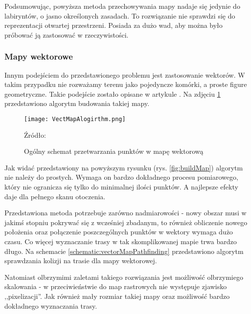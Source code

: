             Podsumowując, powyższa metoda przechowywania mapy nadaje się jedynie do labiryntów, o jasno określonych zasadach.
            To rozwiązanie nie sprawdzi się do reprezentacji otwartej przestrzeni.
            Posiada za dużo wad, aby można było próbować ją zastosować w rzeczywistości.

        \subsubsection{Mapy wektorowe}
            Innym podejściem do przedstawionego problemu jest zastosowanie wektorów.
            W takim przypadku nie rozważamy terenu jako pojedyncze komórki, a proste figure geometryczne.
            Takie podejście zostało opisane w artykule \cite{vector_map}.
            Na zdjęciu \ref{fig:buildVectMap} przedstawiono algorytm budowania takiej mapy.

            \begin{figure}[!ht]
                \centering
                \texttt{[image: VectMapAlogirthm.png]}
                \caption{Ogólny schemat przetwarzania punktów w mapę wektorową}
                Źródło: \cite{vector_map}
                \label{fig:buildVectMap}
            \end{figure}

            Jak widać przedstawiony na powyższym rysunku (rys. \ref{fig:buildMap}) algorytm nie należy do prostych.
            Wymaga on bardzo dokładnego procesu pomiarowego, który nie ogranicza się tylko do minimalnej ilości punktów.
            A najlepsze efekty daje dla pełnego skanu otoczenia.

            Przedstawiona metoda potrzebuje zarówno nadmiarowości - nowy obszar musi w jakimś stopniu pokrywać się z wcześniej zbadanym,
            to również obliczenie nowego położenia oraz połączenie poszczególnych punktów w wektory wymaga dużo czasu.
            Co więcej wyznaczanie trasy w tak skomplikowanej mapie trwa bardzo długo.
            Na schemacie \ref{schematic:vectorMapPathfinding} przedstawiono algorytm sprawdzania kolizji na trasie dla mapy wektorowej.

            

            Natomiast olbrzymimi zaletami takiego rozwiązania jest możliwość olbrzymiego skalowania - w przeciwieństwie do map rastrowych nie występuje zjawisko ,,pixelizacji''.
            Jak również mały rozmiar takiej mapy oraz możliwość bardzo dokładnego wyznaczania trasy.


